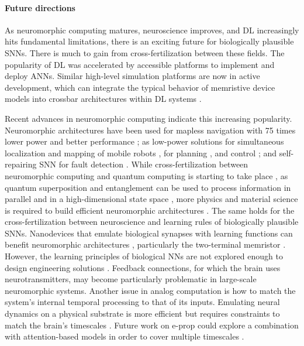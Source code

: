 \paragraph{Future directions}
    As neuromorphic computing matures, neuroscience improves, and DL increasingly hits fundamental limitations, there is an exciting future for biologically plausible SNNs.
    There is much to gain from cross-fertilization between these fields.
    The popularity of DL was accelerated by accessible platforms to implement and deploy ANNs.
    Similar high-level simulation platforms are now in active development, which can integrate the typical behavior of memristive device models into crossbar architectures within DL systems \citep{lammie2020memtorch}.

    Recent advances in neuromorphic computing indicate this increasing popularity.
    Neuromorphic architectures have been used for mapless navigation with 75 times lower power and better performance \citep{tang2020reinforcement}; as low-power solutions for simultaneous localization and mapping of mobile robots \citep{tang2019spiking}, for planning \citep{fischl2017path}, and control \citep{blum2017neuromorphic}; and self-repairing SNN for fault detection \citep{zhu2017target}.
    While cross-fertilization between neuromorphic computing and quantum computing is starting to take place \citep{russek2016stochastic}, as quantum superposition and entanglement can be used to process information in parallel and in a high-dimensional state space \citep{fujii2017harnessing, yamamoto2017coherent,tacchino2019artificial}, more physics and material science is required to build efficient neuromorphic architectures \citep{markovic2020physics}.
    The same holds for the cross-fertilization between neuroscience and learning rules of biologically plausible SNNs.
    Nanodevices that emulate biological synapses with learning functions can benefit neuromorphic architectures \citep{yao2017face,wang2018photonic,ren2018analytical}, particularly the two-terminal memristor \citep{jo2010nanoscale,wang2017memristors}.
    However, the learning principles of biological NNs are not explored enough to design engineering solutions \citep{gorban2019unreasonable,taherkhani2018supervised}.
    Feedback connections, for which the brain uses neurotransmitters, may become particularly problematic in large-scale neuromorphic systems.
    Another issue in analog computation is how to match the system's internal temporal processing to that of its inputs.
    Emulating neural dynamics on a physical substrate is more efficient but requires constraints to match the brain's timescales \citep{mead1990neuromorphic,jaeger2021dimensions}.
    Future work on e-prop could explore a combination with attention-based models in order to cover multiple timescales \citep{bellec2020solution}.
